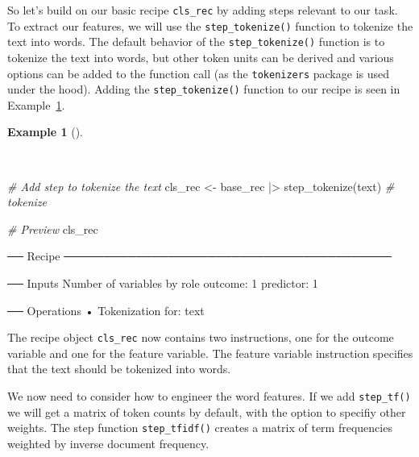 \documentclass[
  letterpaper,
]{latex/krantz}
\newenvironment{Shaded}{\begin{snugshade}}{\end{snugshade}}
\newcommand{\CommentTok}[1]{\textcolor[rgb]{0.00,0.00,0.00}{\textit{#1}}}
\newcommand{\FunctionTok}[1]{\textcolor[rgb]{0.00,0.00,0.00}{#1}}
\newcommand{\NormalTok}[1]{\textcolor[rgb]{0.00,0.00,0.00}{#1}}
\newcommand{\OtherTok}[1]{\textcolor[rgb]{0.00,0.00,0.00}{#1}}
\newcommand{\SpecialCharTok}[1]{\textcolor[rgb]{0.00,0.00,0.00}{#1}}
\theoremstyle{definition}
\newtheorem{example}{Example}[chapter]
\theoremstyle{remark}
\begin{document}
So let's build on our basic recipe \texttt{cls\_rec} by adding steps
relevant to our task. To extract our features, we will use the
\texttt{step\_tokenize()} function to tokenize the text into words. The
default behavior of the \texttt{step\_tokenize()} function is to
tokenize the text into words, but other token units can be derived and
various options can be added to the function call (as the
\texttt{tokenizers} package is used under the hood). Adding the
\texttt{step\_tokenize()} function to our recipe is seen in
Example~\ref{exm-pda-class-recipe-tokenize}.

\begin{example}[]\protect\hypertarget{exm-pda-class-recipe-tokenize}{}\label{exm-pda-class-recipe-tokenize}

~

\begin{Shaded}
\begin{Highlighting}[]
\CommentTok{\# Add step to tokenize the text}
\NormalTok{cls\_rec }\OtherTok{\textless{}{-}}
\NormalTok{  base\_rec }\SpecialCharTok{|\textgreater{}}
  \FunctionTok{step\_tokenize}\NormalTok{(text) }\CommentTok{\# tokenize}

\CommentTok{\# Preview}
\NormalTok{cls\_rec}
\end{Highlighting}
\end{Shaded}

\begin{Shaded}
\begin{Highlighting}[]
\NormalTok{── Recipe ─────────────────────────────────────────}

\NormalTok{── Inputs}
\NormalTok{Number of variables by role}
\NormalTok{outcome:   1}
\NormalTok{predictor: 1}

\NormalTok{── Operations}
\NormalTok{• Tokenization for: text}
\end{Highlighting}
\end{Shaded}

\end{example}

The recipe object \texttt{cls\_rec} now contains two instructions, one
for the outcome variable and one for the feature variable. The feature
variable instruction specifies that the text should be tokenized into
words.

We now need to consider how to engineer the word features. If we add
\texttt{step\_tf()} we will get a matrix of token counts by default,
with the option to specifiy other weights. The step function
\texttt{step\_tfidf()} creates a matrix of term frequencies weighted by
inverse document frequency.
\end{document}
